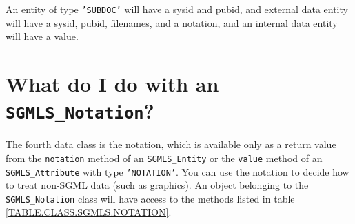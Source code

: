 An entity of type {\tt 'SUBDOC'} will have a sysid
and pubid, and external data entity will have a sysid, pubid,
filenames, and a notation, and an internal data entity will have a
value.




\section{What do I do with an {\tt SGMLS\_Notation}?}
\label{SGMLSNOTATION}


The fourth data class is the notation, which is available only
as a return value from the {\tt notation} method of an
{\tt SGMLS\_Entity}
or the {\tt value} method of an {\tt SGMLS\_Attribute}
with type {\tt 'NOTATION'}.  You can use the notation to
decide how to treat non-SGML data (such as graphics).  An object
belonging to the {\tt SGMLS\_Notation} class will have
access to the methods listed in table \ref{TABLE.CLASS.SGMLS.NOTATION}.

